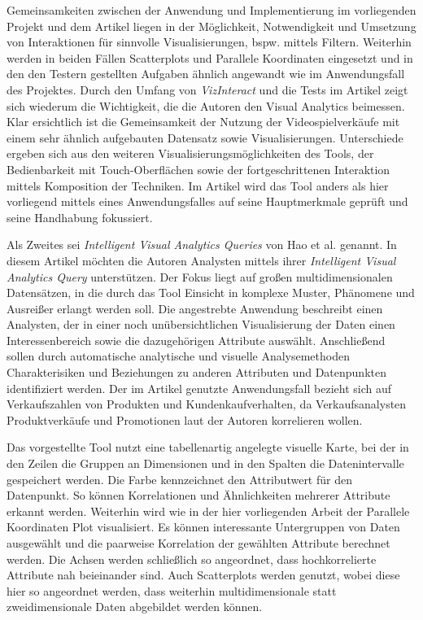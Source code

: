 \documentclass[usegeometry=true]{scrartcl}
\begin{document}
Gemeinsamkeiten zwischen der Anwendung und Implementierung im vorliegenden Projekt und dem Artikel liegen in der Möglichkeit, Notwendigkeit und Umsetzung von Interaktionen für sinnvolle Visualisierungen, bspw. mittels Filtern.
Weiterhin werden in beiden Fällen Scatterplots und Parallele Koordinaten eingesetzt und in den den Testern gestellten Aufgaben ähnlich angewandt wie im Anwendungsfall des Projektes. 
Durch den Umfang von \textit{VizInteract} und die Tests im Artikel zeigt sich wiederum die Wichtigkeit, die die Autoren den Visual Analytics beimessen.
Klar ersichtlich ist die Gemeinsamkeit der Nutzung der Videospielverkäufe mit einem sehr ähnlich aufgebauten Datensatz sowie Visualisierungen.
Unterschiede ergeben sich aus den weiteren Visualisierungsmöglichkeiten des Tools, der Bedienbarkeit mit Touch-Oberflächen sowie der fortgeschrittenen Interaktion mittels Komposition der Techniken. 
Im Artikel wird das Tool anders als hier vorliegend mittels eines Anwendungsfalles auf seine Hauptmerkmale geprüft und seine Handhabung fokussiert.

Als Zweites sei \textit{Intelligent Visual Analytics Queries} von Hao et al. genannt.\cite{Hao.2007}
In diesem Artikel möchten die Autoren Analysten mittels ihrer \textit{Intelligent Visual Analytics Query} unterstützen.
Der Fokus liegt auf großen multidimensionalen Datensätzen, in die durch das Tool Einsicht in komplexe Muster, Phänomene und Ausreißer erlangt werden soll.
Die angestrebte Anwendung beschreibt einen Analysten, der in einer noch unübersichtlichen Visualisierung der Daten einen Interessenbereich sowie die dazugehörigen Attribute auswählt.
Anschließend sollen durch automatische analytische und visuelle Analysemethoden Charakterisiken und Beziehungen zu anderen Attributen und Datenpunkten identifiziert werden.
Der im Artikel genutzte Anwendungsfall bezieht sich auf Verkaufszahlen von Produkten und Kundenkaufverhalten, da Verkaufsanalysten Produktverkäufe und Promotionen laut der Autoren korrelieren wollen. 

Das vorgestellte Tool nutzt eine tabellenartig angelegte visuelle Karte, bei der in den Zeilen die Gruppen an Dimensionen und in den Spalten die Datenintervalle gespeichert werden.
Die Farbe kennzeichnet den Attributwert für den Datenpunkt. So können Korrelationen und Ähnlichkeiten mehrerer Attribute erkannt werden.
Weiterhin wird wie in der hier vorliegenden Arbeit der Parallele Koordinaten Plot visualisiert. 
Es können interessante Untergruppen von Daten ausgewählt und die paarweise Korrelation der gewählten Attribute berechnet werden. 
Die Achsen werden schließlich so angeordnet, dass hochkorrelierte Attribute nah beieinander sind. 
Auch Scatterplots werden genutzt, wobei diese hier so angeordnet werden, dass weiterhin multidimensionale statt zweidimensionale Daten abgebildet werden können.
\end{document}
